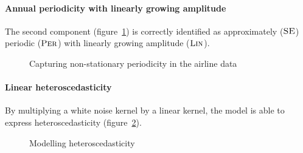 \documentclass{article}
\begin{document}
\paragraph{Annual periodicity with linearly growing amplitude}

The second component (figure~\ref{fig:lin_periodic}) is correctly identified as approximately (${\textsc{SE}}$) periodic (${\textsc{Per}}$) with linearly growing amplitude (${\textsc{Lin}}$).

\begin{figure}[h]
\centering
{}
\caption{Capturing non-stationary periodicity in the airline data}
\label{fig:lin_periodic}
\end{figure}


\paragraph{Linear heteroscedasticity}

By multiplying a white noise kernel by a linear kernel, the model is able to express heteroscedasticity (figure~\ref{fig:heteroscedastic}).

\begin{figure}[h]
\centering
{}
\caption{Modelling heteroscedasticity}
\label{fig:heteroscedastic}
\end{figure}
\end{document}
